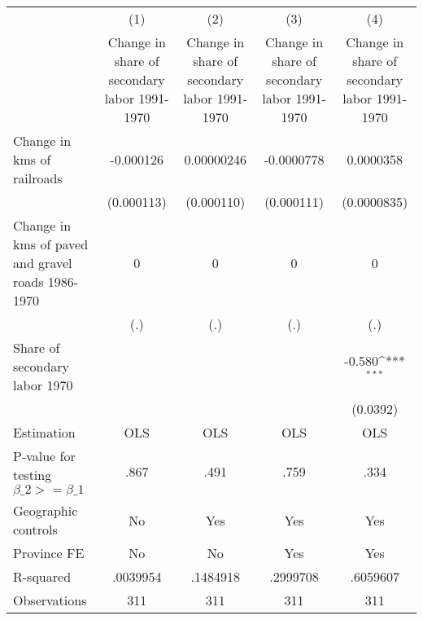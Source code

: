 {
\def\sym#1{\ifmmode^{#1}\else\(^{#1}\)\fi}
\begin{tabular}{l*{4}{c}}
\hline\hline
                &\multicolumn{1}{c}{(1)}&\multicolumn{1}{c}{(2)}&\multicolumn{1}{c}{(3)}&\multicolumn{1}{c}{(4)}\\
                &\multicolumn{1}{c}{Change in share of secondary labor 1991-1970}&\multicolumn{1}{c}{Change in share of secondary labor 1991-1970}&\multicolumn{1}{c}{Change in share of secondary labor 1991-1970}&\multicolumn{1}{c}{Change in share of secondary labor 1991-1970}\\
\hline
Change in kms of railroads&-0.000126         &0.00000246         &-0.0000778         &0.0000358         \\
                &(0.000113)         &(0.000110)         &(0.000111)         &(0.0000835)         \\
[1em]
Change in kms of paved and gravel roads 1986-1970&        0         &        0         &        0         &        0         \\
                &      (.)         &      (.)         &      (.)         &      (.)         \\
[1em]
Share of secondary labor 1970&                  &                  &                  &   -0.580\sym{***}\\
                &                  &                  &                  & (0.0392)         \\
\hline
Estimation      &      OLS         &      OLS         &      OLS         &      OLS         \\
P-value for testing $\beta\_2 >= \beta\_1$&     .867         &     .491         &     .759         &     .334         \\
Geographic controls&       No         &      Yes         &      Yes         &      Yes         \\
Province FE     &       No         &       No         &      Yes         &      Yes         \\
R-squared       & .0039954         & .1484918         & .2999708         & .6059607         \\
Observations    &      311         &      311         &      311         &      311         \\
\hline\hline
\end{tabular}
}
